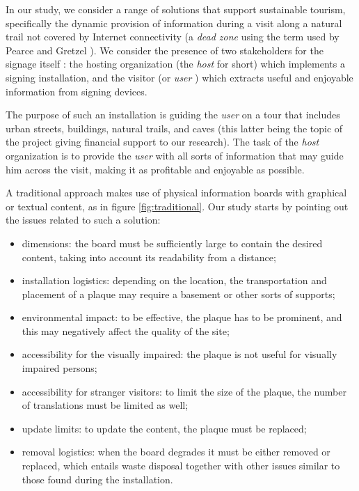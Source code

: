 \documentclass[sustainability,article,submit,pdftex,moreauthors]{Definitions/mdpi}
\begin{document}
In our study, we consider a range of solutions that support sustainable tourism, specifically the dynamic provision of information during a visit along a natural trail not covered by Internet connectivity (a {\em dead zone} using the term used by Pearce and Gretzel \cite{pea12a}). We consider the presence of two stakeholders for the signage itself \cite{wan22a}: the hosting organization (the {\em host} for short) which implements a signing installation, and the visitor (or {\em user} ) which extracts useful and enjoyable information from signing devices. 

The purpose of such an installation is guiding the {\em user} on a tour that includes urban streets, buildings, natural trails, and caves (this latter being the topic of the project giving financial support to our research). The task of the {\em host} organization is to provide the {\em user} with all sorts of information that may guide him across the visit, making it as profitable and enjoyable as possible.

A traditional approach makes use of physical information boards with graphical or textual content, as in figure \ref{fig:traditional}. Our study starts by pointing out the issues related to such a solution:

\begin{itemize}
	\item dimensions: the board must be sufficiently large to contain the desired content, taking into account its readability from a distance;
	\item installation logistics: depending on the location, the transportation and placement of a plaque may require a basement or other sorts of supports;
	\item environmental impact: to be effective, the plaque has to be prominent, and this may negatively affect the quality of the site; 
	\item accessibility for the visually impaired: the plaque is not useful for visually impaired persons;
	\item accessibility for stranger visitors: to limit the size of the plaque, the number of translations must be limited as well;
	\item update limits: to update the content, the plaque must be replaced;
	\item removal logistics: when the board degrades it must be either removed or replaced, which entails waste disposal together with other issues similar to those found during the installation.
\end{itemize}
\end{document}
